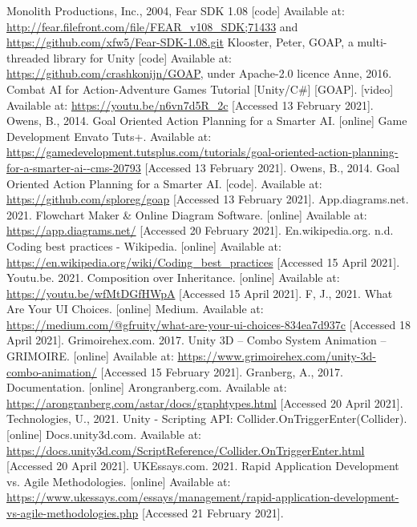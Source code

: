 \documentclass[11pt]{report}
\begin{document}
\begin{thebibliography}{}
    Monolith Productions, Inc., 2004, Fear SDK 1.08 [code] Available at: \url{http://fear.filefront.com/file/FEAR_v108_SDK;71433} and \url{https://github.com/xfw5/Fear-SDK-1.08.git}
    Klooster, Peter, GOAP, a multi-threaded library for Unity [code] Available at: \url{https://github.com/crashkonijn/GOAP}, under Apache-2.0 licence
    Anne, 2016. Combat AI for Action-Adventure Games Tutorial [Unity/C\#] [GOAP]. [video] Available at: \url{https://youtu.be/n6vn7d5R_2c} [Accessed 13 February 2021].
    Owens, B., 2014. Goal Oriented Action Planning for a Smarter AI. [online] Game Development Envato Tuts+. Available at: \url{https://gamedevelopment.tutsplus.com/tutorials/goal-oriented-action-planning-for-a-smarter-ai--cms-20793} [Accessed 13 February 2021].
    Owens, B., 2014. Goal Oriented Action Planning for a Smarter AI. [code]. Available at: \url{https://github.com/sploreg/goap} [Accessed 13 February 2021].
    App.diagrams.net. 2021. Flowchart Maker \& Online Diagram Software. [online] Available at: \url{https://app.diagrams.net/} [Accessed 20 February 2021].
    En.wikipedia.org. n.d. Coding best practices - Wikipedia. [online] Available at: \url{https://en.wikipedia.org/wiki/Coding_best_practices} [Accessed 15 April 2021].
    Youtu.be. 2021. Composition over Inheritance. [online] Available at: \url{https://youtu.be/wfMtDGfHWpA} [Accessed 15 April 2021].
    F, J., 2021. What Are Your UI Choices. [online] Medium. Available at: \url{https://medium.com/@gfruity/what-are-your-ui-choices-834ea7d937c} [Accessed 18 April 2021].
    Grimoirehex.com. 2017. Unity 3D – Combo System Animation – GRIMOIRE. [online] Available at: \url{https://www.grimoirehex.com/unity-3d-combo-animation/} [Accessed 15 February 2021].
    Granberg, A., 2017. Documentation. [online] Arongranberg.com. Available at: \url{https://arongranberg.com/astar/docs/graphtypes.html} [Accessed 20 April 2021].
    Technologies, U., 2021. Unity - Scripting API: Collider.OnTriggerEnter(Collider). [online] Docs.unity3d.com. Available at: \url{https://docs.unity3d.com/ScriptReference/Collider.OnTriggerEnter.html} [Accessed 20 April 2021].
    UKEssays.com. 2021. Rapid Application Development vs. Agile Methodologies. [online] Available at: \url{https://www.ukessays.com/essays/management/rapid-application-development-vs-agile-methodologies.php} [Accessed 21 February 2021].

\end{thebibliography}
\end{document}
